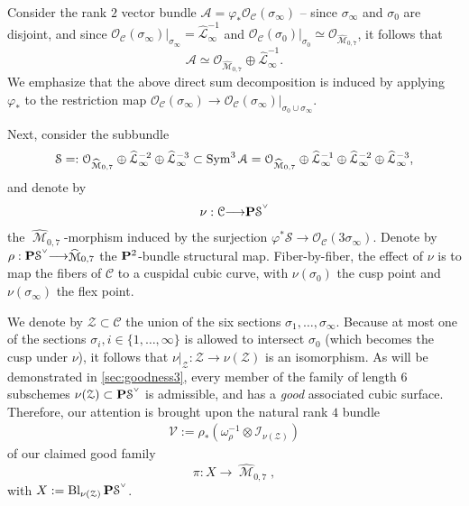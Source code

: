\documentclass[12pt,reqno]{amsart}
\DeclareMathOperator{\Bl}{Bl}
\DeclareMathOperator{\M}{\mathcal{M}}
\renewcommand{\to}{{\longrightarrow}}
\numberwithin{equation}{section}
\renewcommand{\O}{\mathcal O}
\newcommand{\V}{\mathcal V}
\newcommand{\cC}{\mathcal{C}}
\newcommand{\hL}{\widehat{\mathcal{L}}}
\newcommand{\smvee}{\raise0.5ex\hbox{$\scriptscriptstyle\vee$}}
\newcommand{\hM}{\widehat{\M}}
\begin{document}
Consider the rank $2$
vector bundle $\mathcal{A} = \varphi_{*}\O_{\cC}(\sigma_{\infty})$ --
since $\sigma_{\infty}$ and $\sigma_{0}$ are disjoint, and since
$\O_{\cC}(\sigma_{\infty})|_{\sigma_{\infty}} = \hL_{\infty}^{-1}$ and
$\O_{\cC}(\sigma_{0})|_{\sigma_{0}} \simeq \O_{\hM_{0,7}}$, it follows
that
$$\mathcal{A} \simeq \O_{\hM_{0,7}} \oplus \hL_{\infty}^{-1}.$$
We emphasize that the above direct sum decomposition is induced by
applying $\varphi_{*}$ to the restriction map
$\O_{\cC}(\sigma_{\infty}) \to \O_{\cC}(\sigma_{\infty})|_{\sigma_{0}
  \cup \sigma_{\infty}}.$

  Next, consider the subbundle
  \begin{align}
    \label{eq:S}
    \mathcal{S} = :\O_{\hM_{0,7}} \oplus \hL_{\infty}^{-2} \oplus \hL_{\infty}^{-3} \subset \Sym^{3} \mathcal{A} = \O_{\hM_{0,7}} \oplus \hL_{\infty}^{-1} \oplus \hL_{\infty}^{-2} \oplus \hL_{\infty}^{-3},
  \end{align}
  and denote by
  \begin{align}
    \label{eq:nu}
    \nu: \cC \to \P \mathcal{S}^{\smvee}
  \end{align}
  the $\hM_{0,7}$-morphism induced by the surjection
  $\varphi^{*}\mathcal{S} \to \O_{\cC}(3\sigma_{\infty})$. Denote by
  $\rho: \P \mathcal{S}^{\smvee} \to \hM_{0,7}$ the $\P^{2}$-bundle
  structural map.  Fiber-by-fiber, the effect of $\nu$ is to map the
  fibers of $\cC$ to a cuspidal cubic curve, with $\nu(\sigma_{0})$
  the cusp point and $\nu(\sigma_{\infty})$ the flex point.

  We denote by $\mathcal{Z} \subset \cC$ the union of the six sections
  $\sigma_{1}, \dots, \sigma_{\infty}$.  Because at most one of the
  sections $\sigma_{i}, i \in \{1, \dots, \infty\}$ is allowed to
  intersect $\sigma_{0}$ (which becomes the cusp under $\nu$), it
  follows that $\nu|_{\mathcal{Z}}:\mathcal{Z} \to \nu(\mathcal{Z})$
  is an isomorphism. As will be demonstrated in
  \autoref{sec:goodness3}, every member of the family of length $6$
  subschemes $\nu(\mathcal{Z}) \subset \P \mathcal{S}^{\smvee}$ is
  admissible, and has a {\sl good} associated cubic surface.
  Therefore, our attention is brought upon the natural rank $4$ bundle
  \begin{align}
    \label{eq:V3}
    \V := \rho_{*}\left(\omega_{\rho}^{-1} \otimes \mathcal{I}_{\nu(\mathcal{Z})}\right)
  \end{align}
  of our claimed good family $$\pi: X \to \hM_{0,7},$$ with
  $X := \Bl_{\nu(\mathcal{Z})}\P \mathcal{S}^{\smvee}$.
\end{document}
